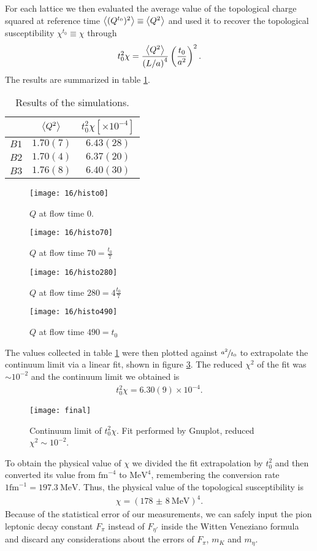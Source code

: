 For each lattice we  then evaluated the average value of the topological charge squared at reference time $\ev{(Q^{t_{0}})^{2}}\equiv\ev{Q^{2}}$ and used it
to recover the topological susceptibility $\chi^{t_{0}} \equiv \chi$ through
\begin{align}
  t_{0}^{2}\chi = \frac{\ev{Q ^2}}{\left(L/a\right)^{4}}\left(\frac{t_{0}}{a ^2}\right)^2.
\end{align}
The results are summarized in table \ref{tab:values}.
\begin{table}[H]
  \centering
\begin{tabular}{@{}ccc@{}}
  \toprule
     & $\ev{Q^2}$ & $t_0^2\chi [\times 10^{-4}]$ \\ \midrule
$B1$ & $1.70(7)$  & $6.43(28)$                   \\
$B2$ & $1.70(4)$  & $6.37(20)$                   \\
$B3$ & $1.76(8)$  & $6.40(30)$\\ \bottomrule
\end{tabular}
\caption{\label{tab:values}Results of the simulations.}
\end{table}
\begin{figure}[H]
  \centering
  \texttt{[image: 16/histo0]}
  \caption{\label{fig:histo0}$Q$ at flow time $0$.}
  \texttt{[image: 16/histo70]}
  \caption{\label{fig:histo70}$Q$ at flow time $70 = \frac{t_{0}}{7}$}
\end{figure}
\begin{figure}[H]
  \texttt{[image: 16/histo280]}
  \caption{\label{fig:histo280}$Q$ at flow time $280 = 4\frac{t_{0}}{7}$}
  \texttt{[image: 16/histo490]}
  \caption{\label{fig:histo490}$Q$ at flow time $490 = t_{0}$}
\end{figure}
The values collected in table \ref{tab:values} were then plotted against $\nicefrac{a ^2}{t_{0}}$ to extrapolate the continuum limit
via a linear fit, shown in figure \ref{fig:final}. The reduced $\chi ^2$ of the fit was $\sim 10 ^{-2}$ and the continuum limit we obtained is
\begin{align}
  \label{eqn:contsusc}
  t_{0}^{2} \chi = 6.30(9)\times 10 ^{-4}.
\end{align}
\begin{figure}[H]
  \centering
  \texttt{[image: final]}
  \caption{\label{fig:final}Continuum limit of $t_{0}^2\chi$. Fit performed by Gnuplot, reduced $\chi ^2\sim 10^{-2}$.}
\end{figure}
To obtain the physical value of $\chi$ we divided the fit extrapolation by $t_{0}^2$ and then converted its value from $\si{\femto\metre}^{-4}$ to
$\si{\mega\electronvolt}^{4}$, remembering the conversion rate $1\si{\femto\metre}^{-1}=\SI{197.3}{\mega\electronvolt}$. Thus, the physical value of the topological susceptibility is
\begin{align}
  \chi = \left(\SI{178(8)}{\mega\electronvolt}\right)^{4}.
\end{align}
Because of the statistical error of our measurements, we can safely input the pion leptonic decay constant $F_{\pi}$ instead of $F_{\eta'}$ inside the Witten Veneziano formula and discard
any considerations about the errors of $F_{\pi}$, $m_{K}$ and $m_{\eta}$.

